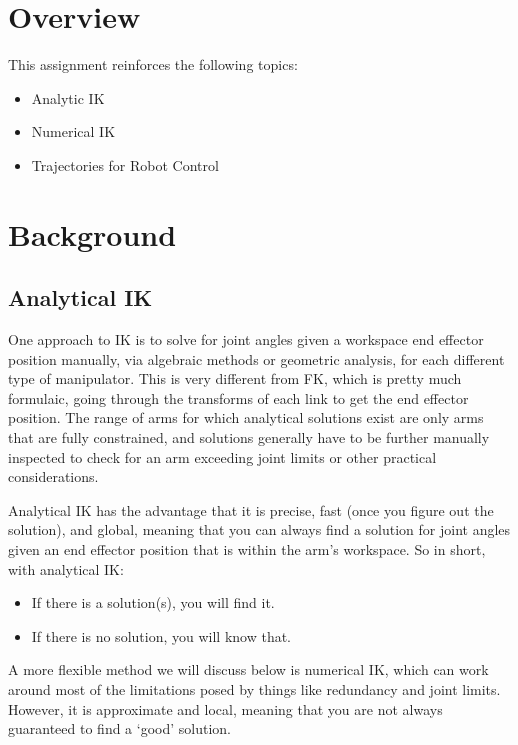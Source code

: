 \documentclass{16384_doc}
\begin{document}
\maketitle

\tableofcontents

\section{Overview}
This assignment reinforces the following topics:
\begin{itemize}

\item Analytic IK
\item Numerical IK
\item Trajectories for Robot Control

\end{itemize}

\section{Background}

\subsection{Analytical IK}

One approach to IK is to solve for joint angles given a workspace end effector
position manually, via algebraic methods or geometric
analysis, for each different type of manipulator.  This is very different from
FK, which is pretty much formulaic, going through the transforms of each
link to get the end effector position.  The range of arms for which analytical
solutions exist are only arms that are fully constrained, and solutions generally
have to be further manually inspected to check for an arm exceeding joint limits
or other practical considerations.

Analytical IK has the advantage that it is precise, fast (once you figure out
the solution), and global, meaning that you can always find a solution for joint
angles given an end effector position that is within the arm’s workspace.  So in
short, with analytical IK:
\begin{itemize}
\item If there is a solution(s), you will find it.
\item If there is no solution, you will know that.
\end{itemize}

A more flexible method we will discuss below is numerical IK, which can work
around most of the limitations posed by things like redundancy and joint limits.
However, it is approximate and local, meaning that you are not always guaranteed
to find a `good' solution.
\end{document}
